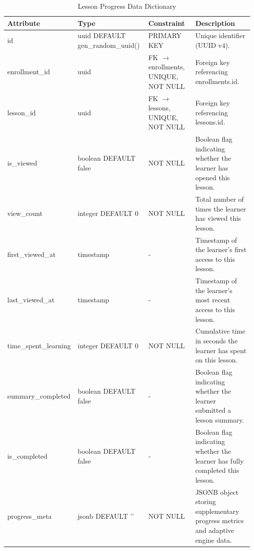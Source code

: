 \documentclass[12pt, oneside]{article} %
\newcommand{\tabbreak}{\hyphenpenalty=200\exhyphenpenalty=200\tolerance=4000\hbadness=10000\hspace{0pt}}
\begin{document}
\begin{table}[H]
\caption{Lesson Progress Data Dictionary}
\label{tab:dd_lesson_progress}
\vspace{-4mm}
\begin{center}
\renewcommand{\arraystretch}{1.15}
\scriptsize
\begin{tabular}{|>{\raggedright\arraybackslash\tabbreak}p{2.67cm}|>{\raggedright\arraybackslash\tabbreak}p{2.93cm}|>{\raggedright\arraybackslash\tabbreak}p{2.67cm}|>{\raggedright\arraybackslash\tabbreak}p{4.51cm}|}
\hline
\textbf{Attribute} & \textbf{Type} & \textbf{Constraint} & \textbf{Description} \\ \hline
id & uuid DEFAULT gen\_random\_uuid() & PRIMARY KEY & Unique identifier (UUID v4). \\ \hline
enrollment\_id & uuid & FK $\rightarrow$ enrollments, UNIQUE, NOT NULL & Foreign key referencing enrollments.id. \\ \hline
lesson\_id & uuid & FK $\rightarrow$ lessons, UNIQUE, NOT NULL & Foreign key referencing lessons.id. \\ \hline
is\_viewed & boolean DEFAULT false & NOT NULL & Boolean flag indicating whether the learner has opened this lesson. \\ \hline
view\_count & integer DEFAULT 0 & NOT NULL & Total number of times the learner has viewed this lesson. \\ \hline
first\_viewed\_at & timestamp & - & Timestamp of the learner's first access to this lesson. \\ \hline
last\_viewed\_at & timestamp & - & Timestamp of the learner's most recent access to this lesson. \\ \hline
time\_spent\_learning & integer DEFAULT 0 & NOT NULL & Cumulative time in seconds the learner has spent on this lesson. \\ \hline
summary\_completed & boolean DEFAULT false & - & Boolean flag indicating whether the learner submitted a lesson summary. \\ \hline
is\_completed & boolean DEFAULT false & - & Boolean flag indicating whether the learner has fully completed this lesson. \\ \hline
progress\_meta & jsonb DEFAULT '{}' & NOT NULL & JSONB object storing supplementary progress metrics and adaptive engine data. \\ \hline
\end{tabular}
\end{center}
\end{table}
\end{document}
